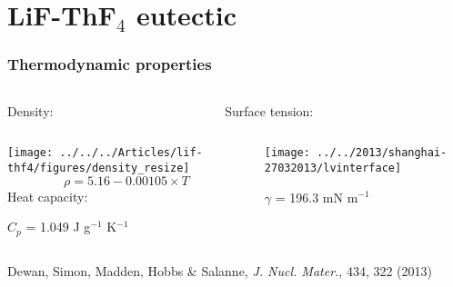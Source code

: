 \documentclass{beamer}
\begin{document}
\section{LiF-ThF$_4$ eutectic}

\begin{frame}
   \frametitle{Thermodynamic properties}
   \begin{columns}
      \begin{column}{6cm}
      Density:
      \end{column}
      \begin{column}{6cm}
      Surface tension:
      \end{column}
   \end{columns}
   \begin{columns}
      \begin{column}{6cm}
       \texttt{[image: ../../../Articles/lif-thf4/figures/density\_resize]}
      \begin{equation}
        \rho= 5.16 -0.00105\times T  \nonumber
      \end{equation}
      Heat capacity:\\
      \begin{center}
        $C_p$ = 1.049 J g$^{-1}$ K$^{-1}$  
      \end{center}
      \end{column}
      \begin{column}{6cm}
      \begin{center}
       \texttt{[image: ../../2013/shanghai-27032013/lvinterface]}

        $\gamma$ = 196.3 mN m$^{-1}$
      \end{center}
      
      \end{column}
   \end{columns}
    
    \vspace{0.2cm}
    \begin{center}
   \scriptsize{Dewan, Simon, Madden, Hobbs \& Salanne, {\it J. Nucl. Mater.}, 434, 322 (2013)}
    \end{center}
   
\end{frame}
\end{document}
